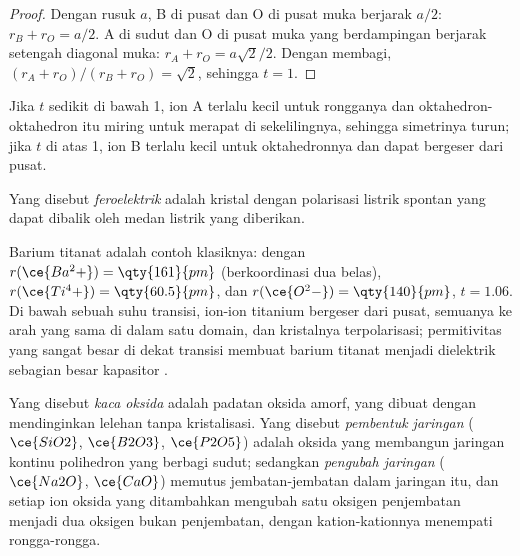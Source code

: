 \begin{proof}
Dengan rusuk $a$, B di pusat dan O di pusat muka berjarak $a/2$: $r_B + r_O = a/2$.
A di sudut dan O di pusat muka yang berdampingan berjarak setengah diagonal muka:
$r_A + r_O = a\sqrt2/2$. Dengan membagi, $(r_A + r_O)/(r_B + r_O) = \sqrt2$, sehingga $t = 1$.
\end{proof}

Jika $t$ sedikit di bawah 1, ion A terlalu kecil untuk rongganya dan
oktahedron-oktahedron itu miring untuk merapat di sekelilingnya, sehingga simetrinya turun; jika $t$ di atas 1,
ion B terlalu kecil untuk oktahedronnya dan dapat bergeser dari pusat.

\begin{definition}[Feroelektrik]\label{def:b3:inorganic-materials:ferroelectric}
Yang disebut \emph{feroelektrik} adalah kristal dengan polarisasi listrik
spontan yang dapat dibalik oleh medan listrik yang diberikan.
\end{definition}

Barium titanat adalah contoh klasiknya: dengan $r(\ce{Ba^2+}) = \qty{161}{pm}$ (berkoordinasi dua belas),
$r(\ce{Ti^4+}) = \qty{60.5}{pm}$, dan $r(\ce{O^2-}) = \qty{140}{pm}$, $t = 1.06$. Di bawah sebuah suhu transisi, ion-ion
titanium bergeser dari pusat, semuanya ke arah yang sama di dalam satu domain,
dan kristalnya terpolarisasi; permitivitas yang sangat besar di dekat transisi membuat
barium titanat menjadi dielektrik sebagian besar kapasitor .

\begin{definition}\label{def:b3:inorganic-materials:glass}
Yang disebut \emph{kaca oksida} adalah padatan oksida amorf, yang dibuat dengan
mendinginkan lelehan tanpa kristalisasi. Yang disebut \emph{pembentuk
jaringan} ($\ce{SiO2}$, $\ce{B2O3}$, $\ce{P2O5}$) adalah oksida yang membangun jaringan kontinu
polihedron yang berbagi sudut; sedangkan \emph{pengubah jaringan}
($\ce{Na2O}$, $\ce{CaO}$) memutus jembatan-jembatan dalam jaringan itu, dan setiap ion oksida yang ditambahkan mengubah satu
oksigen penjembatan menjadi dua oksigen bukan penjembatan, dengan kation-kationnya menempati
rongga-rongga.
\end{definition}

